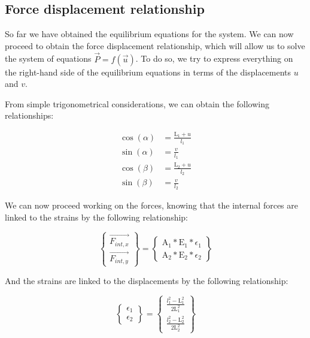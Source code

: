 \subsection{Force displacement relationship}

So far we have obtained the equilibrium equations for the system.
We can now proceed to obtain the force displacement relationship, which will allow us to solve the system of equations ${\vec{P}} = f({\vec{u}})$.
To do so, we try to express everything on the right-hand side of the equilibrium equations in terms of the displacements $u$ and $v$.

From simple trigonometrical considerations, we can obtain the following relationships:

\begin{align}
    \cos(\alpha) & = \frac{\text{L}_1+u}{l_1} \\
    \sin(\alpha) & = \frac{v}{l_1}            \\
    \cos(\beta)  & = \frac{\text{L}_2+u}{l_2} \\
    \sin(\beta)  & = \frac{v}{l_2}
\end{align}

We can now proceed working on the forces, knowing that the internal forces are linked to the strains by the following relationship:

\begin{equation}
    \begin{Bmatrix}
        \vec{F_{int,x}} \\
        \vec{F_{int,y}}
    \end{Bmatrix}
    =
    \begin{Bmatrix}
        \text{A}_1 * \text{E}_1 * \epsilon_1 \\
        \text{A}_2 * \text{E}_2 * \epsilon_2
    \end{Bmatrix}
\end{equation}

And the strains are linked to the displacements by the following relationship:

\begin{equation}
    \begin{Bmatrix}
        \epsilon_1 \\
        \epsilon_2
    \end{Bmatrix}
    =
    \begin{Bmatrix}
        \frac{l_1^2-\text{L}_1^2}{2 \text{L}_1^2} \\
        \frac{l_2^2-\text{L}_2^2}{2 \text{L}_2^2}
    \end{Bmatrix}
\end{equation}

